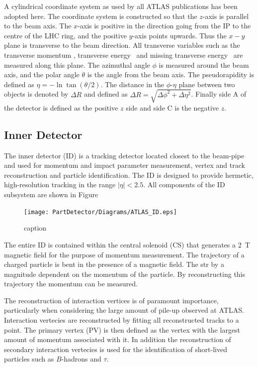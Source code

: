 A cylindrical coordinate system as used by all ATLAS publications has been adopted here. The coordinate system is constructed so that the $z$-axis is parallel to the beam axis. The $x$-axis is positive in the direction going from the IP to the centre of the LHC ring, and the positive $y$-axis points upwards. Thus the $x-y$ plane is transverse to the beam direction. All transverse variables such as the transverse momentum \pt, transverse energy \Et\ and missing transverse energy \met\ are measured along this plane. The azimuthal angle $\phi$ is measured around the beam axis, and the polar angle $\theta$ is the angle from the beam axis. The pseudorapidity is defined as $\eta=-\ln\tan(\theta/2)$. The distance in the $\phi$-$\eta$ plane between two objects is denoted by $\Delta R$ and defined as $\Delta R = \sqrt{\Delta\phi^{2} + \Delta\eta^{2}}$. Finally side A of the detector is defined as the positive $z$ side and side C is the negative $z$.

\subsection{Inner Detector} \label{subsec:DetectorID}
The inner detector (ID) is a tracking detector located closest to the beam-pipe and used for momentum and impact parameter measurement, vertex and track reconstruction and particle identification. The ID is designed to provide hermetic, high-resolution tracking in the range $|\eta|<2.5$. All components of the ID subsystem are shown in Figure

\begin{figure}[htbp]
  \centering
  \texttt{[image: PartDetector/Diagrams/ATLAS\_ID.eps]}
  \caption{caption}
  \label{fig:DetectorIDOverview}
\end{figure}

The entire ID is contained within the central solenoid (CS) that generates a \SI{2}{\tesla} magnetic field for the purpose of momentum measurement. The trajectory of a charged particle is bent in the presence of a magnetic field. The str by a magnitude dependent on the momentum of the particle. By reconstructing this trajectory the momentum can be measured. 

The reconstruction of interaction vertices is of paramount importance, particularly when considering the large amount of pile-up observed at ATLAS. Interaction vertecies are reconstructed by fitting all reconstructed tracks to a point. The primary vertex (PV) is then defined as the vertex with the largest amount of momentum associated with it. In addition the reconstruction of secondary interaction vertecies is used for the identification of short-lived particles such as $B$-hadrons and $\tau$.

